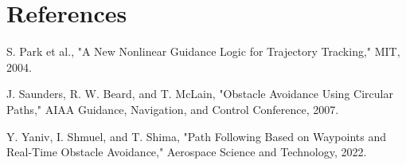 \documentclass[12pt]{article}
\begin{document}
\section*{References}
\begin{enumerate}[label={[\arabic*]}]
  \item S. Park et al., "A New Nonlinear Guidance Logic for Trajectory Tracking," MIT, 2004.
  \item J. Saunders, R. W. Beard, and T. McLain, "Obstacle Avoidance Using Circular Paths," AIAA Guidance, Navigation, and Control Conference, 2007.
  \item Y. Yaniv, I. Shmuel, and T. Shima, "Path Following Based on Waypoints and Real-Time Obstacle Avoidance," Aerospace Science and Technology, 2022.
\end{enumerate}
\end{document}
